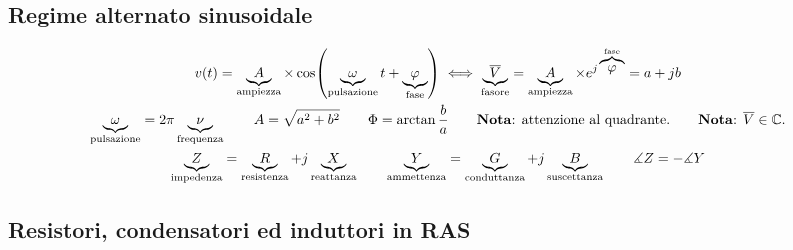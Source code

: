 \documentclass[10pt]{article}
\begin{document}
    \vspace{-\baselineskip}
    \subsection*{Regime alternato sinusoidale}
    \vspace{-1.5\baselineskip}

        \begin{gather*}
            v(t) = \underbrace{A}_{\text{ampiezza}} \times \cos (\underbrace{\omega}_{\text{pulsazione}} t + \underbrace{\varphi}_{\text{fase}}) \iff \underbrace{\overline{V}}_{\text{fasore}} = \underbrace{A}_{\text{ampiezza}} \times e^{j \overbrace{\varphi}^{\text{fase}}} = a + jb\\
            \underbrace{\omega}_{\text{pulsazione}} = 2 \pi \underbrace{\nu}_{\text{frequenza}} \qquad A = \sqrt{a^2 + b^2} \qquad \Phi = \arctan{\frac{b}{a}} \qquad \text{\textbf{Nota}: attenzione al quadrante.} \qquad \text{\textbf{Nota}: } \overline{V} \in \mathbb{C}.\\
            \underbrace{Z}_{\text{impedenza}} = \underbrace{R}_{\text{resistenza}} + j \underbrace{X}_{\text{reattanza}} \qquad \underbrace{Y}_{\text{ammettenza}} = \underbrace{G}_{\text{conduttanza}} + j \underbrace{B}_{\text{suscettanza}} \qquad \measuredangle Z = - \measuredangle Y
        \end{gather*}

    \vspace{-1.5\baselineskip}
    \subsection*{Resistori, condensatori ed induttori in RAS}
    \vspace{-1.5\baselineskip}
\end{document}
